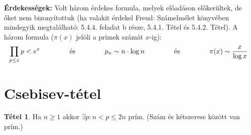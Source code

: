 \documentclass[12pt]{book}
\theoremstyle{plain} %
\theoremstyle{definition} %
\newtheorem{theo/}{Tétel}[section]
\newenvironment{theo}
  {\renewcommand{\qedsymbol}{$\clubsuit$}%
   \pushQED{\qed}\begin{theo/}}
  {\popQED\end{theo/}}
\theoremstyle{remark}
\renewcommand\qedsymbol{$\blacksquare$}
\numberwithin{equation}{section}  %
\begin{document}
	\textbf{Érdekességek:} Volt három érdekes formula, melyek előadáson előkerültek, de őket nem bizonyítottuk (ha valakit érdekel Freud: Számelmélet könyvében mindegyik megtalálható: 5.4.4. feladat b része, 5.4.1. Tétel és 5.4.2. Tétel). A három formula ($\pi(x)$ jelöli a prímek számát $x$-ig):
	\[ \prod\limits_{p\leq x} p < e^x  \hspace{15mm} \text{és} \hspace{15mm} p_n \sim n\cdot \log n \hspace{15mm} \text{és} \hspace{15mm} \pi(x) \sim \dfrac{x}{\log x} \]
	
	\section{Csebisev-tétel}
	
	\begin{theo}
		Ha $n\geq1$ akkor $\exists p: n < p \leq 2n$ prím. (Szám és kétszerese között van prím.)
	\end{theo}
\end{document}

